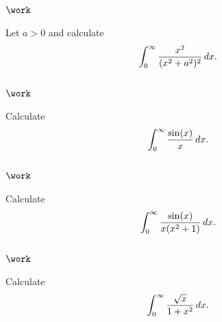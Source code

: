 \hypertarget{work-40}{%
\subsection{\texorpdfstring{\(\work\)}{\textbackslash work}}\label{work-40}}

\begin{problem}[?]

Let \(a>0\) and calculate
\begin{align*}
\int_0^\infty {x^2 \over (x^2 + a^2)^2} \, dx
.\end{align*}

\end{problem}

\hypertarget{work-41}{%
\subsection{\texorpdfstring{\(\work\)}{\textbackslash work}}\label{work-41}}

\begin{problem}[?]

Calculate
\begin{align*}
\int_0^\infty {\sin(x) \over x}\, dx
.\end{align*}

\end{problem}

\hypertarget{work-42}{%
\subsection{\texorpdfstring{\(\work\)}{\textbackslash work}}\label{work-42}}

\begin{problem}[?]

Calculate
\begin{align*}
\int_0^\infty {\sin(x) \over x(x^2+1)}\, dx
.\end{align*}

\end{problem}

\hypertarget{work-43}{%
\subsection{\texorpdfstring{\(\work\)}{\textbackslash work}}\label{work-43}}

\begin{problem}[?]

Calculate
\begin{align*}
\int_0^\infty {\sqrt x \over 1 + x^2} \, dx
.\end{align*}

\end{problem}

